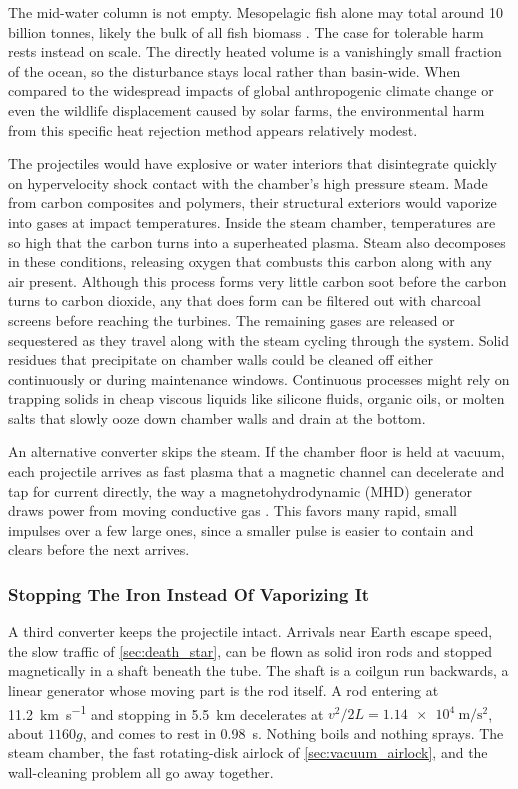 \documentclass{article}
\begin{document}
The mid-water column is not empty. Mesopelagic fish alone may total around 10 billion tonnes, likely the bulk of all fish biomass \cite{irigoien2014mesopelagic}. The case for tolerable harm rests instead on scale. The directly heated volume is a vanishingly small fraction of the ocean, so the disturbance stays local rather than basin-wide. When compared to the widespread impacts of global anthropogenic climate change or even the wildlife displacement caused by solar farms, the environmental harm from this specific heat rejection method appears relatively modest.

The projectiles would have explosive or water interiors that disintegrate quickly on hypervelocity shock contact with the chamber's high pressure steam. Made from carbon composites and polymers, their structural exteriors would vaporize into gases at impact temperatures. Inside the steam chamber, temperatures are so high that the carbon turns into a superheated plasma. Steam also decomposes in these conditions, releasing oxygen that combusts this carbon along with any air present. Although this process forms very little carbon soot before the carbon turns to carbon dioxide, any that does form can be filtered out with charcoal screens before reaching the turbines.   The remaining gases are released or sequestered as they travel along with the steam cycling through the system.   Solid residues that precipitate on chamber walls could be cleaned off either continuously or during maintenance windows.  Continuous processes might rely on trapping solids in cheap viscous liquids like silicone fluids, organic oils, or molten salts that slowly ooze down chamber walls and drain at the bottom.  

An alternative converter skips the steam. If the chamber floor is held at vacuum, each projectile arrives as fast plasma that a magnetic channel can decelerate and tap for current directly, the way a magnetohydrodynamic (MHD) generator draws power from moving conductive gas \cite{dominguez2024mhd}. This favors many rapid, small impulses over a few large ones, since a smaller pulse is easier to contain and clears before the next arrives.

\subsubsection{Stopping The Iron Instead Of Vaporizing It}\label{sec:coil_brake}
A third converter keeps the projectile intact.  Arrivals near Earth escape speed, the slow traffic of \autoref{sec:death_star}, can be flown as solid iron rods and stopped magnetically in a shaft beneath the tube.  The shaft is a coilgun run backwards, a linear generator whose moving part is the rod itself.  A rod entering at \SI{11.2}{\kilo\meter\per\second} and stopping in \SI{5.5}{\kilo\meter} decelerates at $v^2/2L = \SI{1.14e4}{\meter\per\second\squared}$, about $1160g$, and comes to rest in \SI{0.98}{\second}.  Nothing boils and nothing sprays.  The steam chamber, the fast rotating-disk airlock of \autoref{sec:vacuum_airlock}, and the wall-cleaning problem all go away together.
\end{document}

